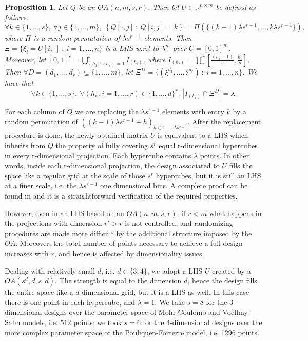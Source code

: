\documentclass{article}
\newtheorem{proposition}[theorem]{Proposition}
\begin{document}
\begin{proposition}
Let $Q$ be an $OA(n,m,s,r)$. Then let $U\in\mathbb R^{n\times m}$ be defined as follows:
$$\forall k\in \{1,\dots,s\},\ \forall j\in \{1,\dots,m\},\ \left\{Q[\cdot,j]\ :\ Q[i,j]=k\right\} = \Pi\left(\{(k-1)\lambda s^{r-1},\dots, k\lambda s^{r-1}\}\right),$$
where $\Pi$ is a random permutation of $\lambda s^{r-1}$ elements. Then $\Xi=\{\xi_i=U[i,\cdot]\ :\ i=1,\dots,n\}$ is a LHS w.r.t to $\lambda^m$ over $C=[0,1]^m$. Moreover, let $[0,1]^r=\bigcup_{(h_1,\dots,h_r)=1}^{s} I_{(h_i)}$, where $I_{(h_i)}=\prod^r_i[\frac{(h_i-1)}{s},\frac{h_i}{s}]$. Then $\forall D=(d_1,\dots,d_r)\subseteq \{1,\dots,m\}$, let $\Xi^D=\{(\xi^{d_1},\dots,\xi^{d_r})\ :\ i=1,\dots,n\}$. We have that
$$\forall k\in \{1,\dots,s\},\ \forall (h_i\ : i=1,\dots,r)\in\{1,\dots,d\}^r,\ \left|I_{(k_i)}\cap\Xi^D\right|=\lambda.$$
\end{proposition}

For each column of $Q$ we are replacing the $\lambda s^{r-1}$ elements with entry $k$ by a random permutation of $\left((k-1)\lambda s^{r-1} + h\right)_{h\in 1,\dots, \lambda s^{r-1}}$. After the replacement procedure is done, the newly obtained matrix $U$ is equivalent to a LHS which inherits from $Q$ the property of fully covering $s^r$ equal r-dimensional hypercubes in every r-dimensional projection. Each hypercube contains $\lambda$ points. In other words, inside each r-dimensional projection, the design associated to $U$ fills the space like a regular grid at the scale of those $s^r$ hypercubes, but it is still an LHS at a finer scale, i.e. the $\lambda s^{r-1}$ one dimensional bins. A complete proof can be found in \cite{Tang1993} and it is a straightforward verification of the required properties.

However, even in an LHS based on an $OA(n,m,s,r)$, if $r<m$ what happens in the projections with dimension $r'>r$ is not controlled, and randomizing procedures are made more difficult by the additional structure imposed by the $OA$. Moreover, the total number of points necessary to achieve a full design increases with $r$, and hence is affected by dimensionality issues.

Dealing with relatively small $d$, i.e. $d\in\{3,4\}$, we adopt a LHS $U$ created by a $OA(s^d,d,s,d)$. The strength is equal to the dimension $d$, hence the design fills the entire space like a $d$ dimensional grid, but it is a LHS as well. In this case there is one point in each hypercube, and $\lambda=1$. We take $s=8$ for the 3-dimensional designs over the parameter space of Mohr-Coulomb and Voellmy-Salm models, i.e. $512$ points; we took $s=6$ for the 4-dimensional designs over the more complex parameter space of the Pouliquen-Forterre model, i.e. 1296 points.

\newpage


\end{document}

